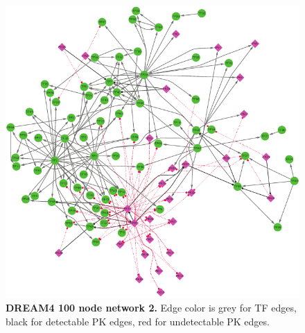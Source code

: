 \begin{figure}[ht]
    \centering
    \includegraphics[width=\textwidth]{appendices/fig/net_100_2.pdf}
    \caption{\textbf{DREAM4 100 node network 2.} Edge color is grey for TF edges, black for detectable PK edges, red for undetectable PK edges.}
    \label{fig:dream4_net100.2}
\end{figure}

